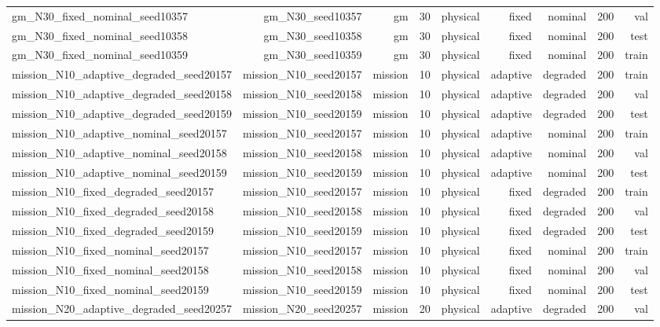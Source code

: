 \begin{tabular}{lrrrrrrrr}
gm\_N30\_fixed\_nominal\_seed10357 & gm\_N30\_seed10357 & gm & 30 & physical & fixed & nominal & 200 & val \\
gm\_N30\_fixed\_nominal\_seed10358 & gm\_N30\_seed10358 & gm & 30 & physical & fixed & nominal & 200 & test \\
gm\_N30\_fixed\_nominal\_seed10359 & gm\_N30\_seed10359 & gm & 30 & physical & fixed & nominal & 200 & train \\
mission\_N10\_adaptive\_degraded\_seed20157 & mission\_N10\_seed20157 & mission & 10 & physical & adaptive & degraded & 200 & train \\
mission\_N10\_adaptive\_degraded\_seed20158 & mission\_N10\_seed20158 & mission & 10 & physical & adaptive & degraded & 200 & val \\
mission\_N10\_adaptive\_degraded\_seed20159 & mission\_N10\_seed20159 & mission & 10 & physical & adaptive & degraded & 200 & test \\
mission\_N10\_adaptive\_nominal\_seed20157 & mission\_N10\_seed20157 & mission & 10 & physical & adaptive & nominal & 200 & train \\
mission\_N10\_adaptive\_nominal\_seed20158 & mission\_N10\_seed20158 & mission & 10 & physical & adaptive & nominal & 200 & val \\
mission\_N10\_adaptive\_nominal\_seed20159 & mission\_N10\_seed20159 & mission & 10 & physical & adaptive & nominal & 200 & test \\
mission\_N10\_fixed\_degraded\_seed20157 & mission\_N10\_seed20157 & mission & 10 & physical & fixed & degraded & 200 & train \\
mission\_N10\_fixed\_degraded\_seed20158 & mission\_N10\_seed20158 & mission & 10 & physical & fixed & degraded & 200 & val \\
mission\_N10\_fixed\_degraded\_seed20159 & mission\_N10\_seed20159 & mission & 10 & physical & fixed & degraded & 200 & test \\
mission\_N10\_fixed\_nominal\_seed20157 & mission\_N10\_seed20157 & mission & 10 & physical & fixed & nominal & 200 & train \\
mission\_N10\_fixed\_nominal\_seed20158 & mission\_N10\_seed20158 & mission & 10 & physical & fixed & nominal & 200 & val \\
mission\_N10\_fixed\_nominal\_seed20159 & mission\_N10\_seed20159 & mission & 10 & physical & fixed & nominal & 200 & test \\
mission\_N20\_adaptive\_degraded\_seed20257 & mission\_N20\_seed20257 & mission & 20 & physical & adaptive & degraded & 200 & val \\

\end{tabular}
